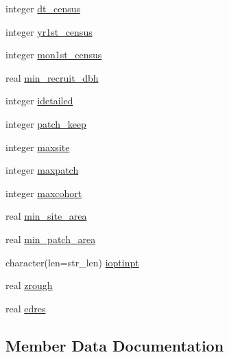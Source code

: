 \begin{DoxyCompactItemize}
\item 
integer \hyperlink{structename__coms_1_1ename__vars_acd4adb0912926306cac73aa6abd71d16}{dt\+\_\+census}
\item 
integer \hyperlink{structename__coms_1_1ename__vars_af95f646dffc7bafbdef282c1e0a0b915}{yr1st\+\_\+census}
\item 
integer \hyperlink{structename__coms_1_1ename__vars_ae40cd69d3cc0356ef74b6601983a7117}{mon1st\+\_\+census}
\item 
real \hyperlink{structename__coms_1_1ename__vars_a37fb5aa022f4e56a4ef81c559ef4e9de}{min\+\_\+recruit\+\_\+dbh}
\item 
integer \hyperlink{structename__coms_1_1ename__vars_a357ee72a65ad802f0b513dc1268da08b}{idetailed}
\item 
integer \hyperlink{structename__coms_1_1ename__vars_a294ad8776f6d095b807d079865c0a54d}{patch\+\_\+keep}
\item 
integer \hyperlink{structename__coms_1_1ename__vars_a99fff9e51d613657edd955243887f482}{maxsite}
\item 
integer \hyperlink{structename__coms_1_1ename__vars_a01e1c83c95742bf3eaefd9ae4ccfa2e6}{maxpatch}
\item 
integer \hyperlink{structename__coms_1_1ename__vars_aac6b1a6dacad31908a45c14d43a78b26}{maxcohort}
\item 
real \hyperlink{structename__coms_1_1ename__vars_ac833ed6581d85c10f8317a93d40cc9b8}{min\+\_\+site\+\_\+area}
\item 
real \hyperlink{structename__coms_1_1ename__vars_a273f97fba1fc90af65c28ee6d7f525d7}{min\+\_\+patch\+\_\+area}
\item 
character(len=str\+\_\+len) \hyperlink{structename__coms_1_1ename__vars_a5ca8f9177953711014581a411923bf61}{ioptinpt}
\item 
real \hyperlink{structename__coms_1_1ename__vars_a3d58740a12137c047498e7ea2e9482d7}{zrough}
\item 
real \hyperlink{structename__coms_1_1ename__vars_ad0785dccc376081a8249a9d2f4ddc43d}{edres}
\end{DoxyCompactItemize}


\subsection{Member Data Documentation}
